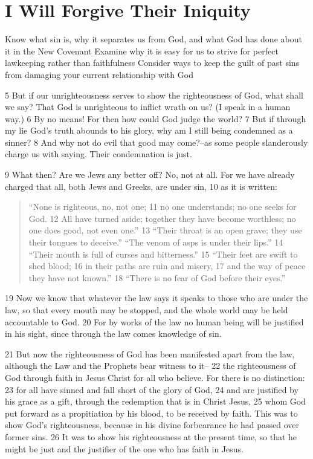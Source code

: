 \chapter{I Will Forgive Their Iniquity}

\begin{goals}
\goal Know what sin is, why it separates us from God, and what God has done about it in the New Covenant
\goal Examine why it is easy for us to strive for perfect lawkeeping rather than faithfulness
\goal Consider ways to keep the guilt of past sins from damaging your current relationship with God
\end{goals}

\begin{bible}
5 But if our unrighteousness serves to show the righteousness of God, what shall we say? That God is unrighteous to inflict wrath on us? (I speak in a human way.) 6 By no means! For then how could God judge the world? 7 But if through my lie God's truth abounds to his glory, why am I still being condemned as a sinner? 8 And why not do evil that good may come?--as some people slanderously charge us with saying. Their condemnation is just.

9 What then? Are we Jews any better off? No, not at all. For we have already charged that all, both Jews and Greeks, are under sin, 10 as it is written:
\begin{quote}
``None is righteous, no, not one;
11     no one understands;
    no one seeks for God.
12 All have turned aside; together they have become worthless;
    no one does good,
    not even one.''
13 ``Their throat is an open grave;
    they use their tongues to deceive.''
``The venom of asps is under their lips.''
14     ``Their mouth is full of curses and bitterness.''
15 ``Their feet are swift to shed blood;
16     in their paths are ruin and misery,
17 and the way of peace they have not known.''
18     ``There is no fear of God before their eyes.''
\end{quote}
19 Now we know that whatever the law says it speaks to those who are under the law, so that every mouth may be stopped, and the whole world may be held accountable to God. 20 For by works of the law no human being will be justified in his sight, since through the law comes knowledge of sin.

21 But now the righteousness of God has been manifested apart from the law, although the Law and the Prophets bear witness to it-- 22 the righteousness of God through faith in Jesus Christ for all who believe. For there is no distinction: 23 for all have sinned and fall short of the glory of God, 24 and are justified by his grace as a gift, through the redemption that is in Christ Jesus, 25 whom God put forward as a propitiation by his blood, to be received by faith. This was to show God's righteousness, because in his divine forbearance he had passed over former sins. 26 It was to show his righteousness at the present time, so that he might be just and the justifier of the one who has faith in Jesus.


\end{bible}

